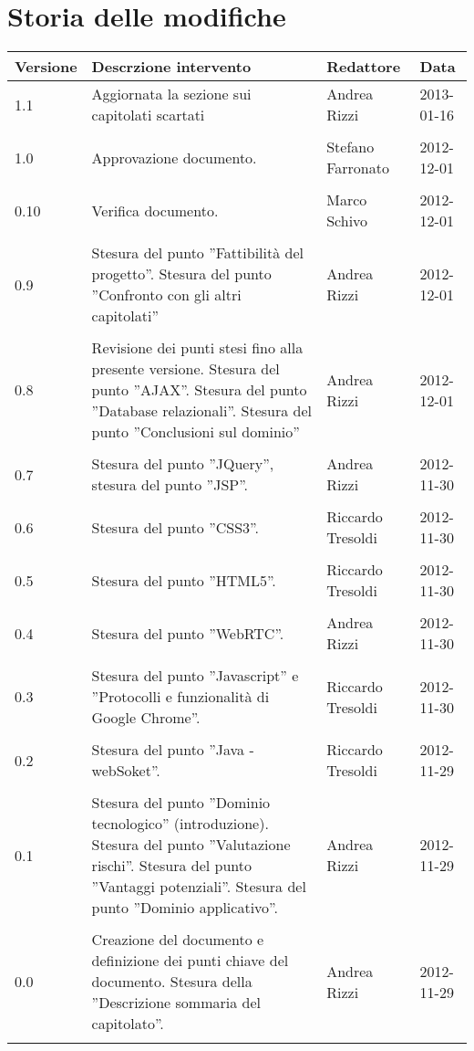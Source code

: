\section*{Storia delle modifiche}
\begin{tabularx}{\textwidth}{lXll}
\toprule
Versione & Descrzione intervento & Redattore & Data\\
\midrule %
1.1 & Aggiornata la sezione sui capitolati scartati & Andrea Rizzi & 2013-01-16\\\\
1.0 & Approvazione documento. & Stefano Farronato & 2012-12-01\\\\
0.10 & Verifica documento. & Marco Schivo & 2012-12-01\\\\
0.9 & Stesura del punto ''Fattibilità del progetto''. Stesura del punto ''Confronto con gli altri capitolati'' & Andrea Rizzi & 2012-12-01\\\\
0.8 & Revisione dei punti stesi fino alla presente versione. Stesura del punto ''AJAX''. Stesura del punto ''Database relazionali''. Stesura del punto ''Conclusioni sul dominio'' & Andrea Rizzi & 2012-12-01\\\\
0.7 & Stesura del punto ''JQuery'', stesura del punto ''JSP''. & Andrea Rizzi & 2012-11-30\\\\
0.6 & Stesura del punto ''CSS3''. & Riccardo Tresoldi & 2012-11-30\\\\
0.5 & Stesura del punto ''HTML5''. & Riccardo Tresoldi& 2012-11-30\\\\
0.4 & Stesura del punto ''WebRTC''. & Andrea Rizzi & 2012-11-30\\\\
0.3 & Stesura del punto ''Javascript'' e ''Protocolli e funzionalità di Google Chrome''.  & Riccardo Tresoldi & 2012-11-30\\\\
0.2 & Stesura del punto ''Java - webSoket''.  & Riccardo Tresoldi & 2012-11-29\\\\
0.1 & Stesura del punto ''Dominio tecnologico'' (introduzione). Stesura del punto ''Valutazione rischi''. Stesura del punto ''Vantaggi potenziali''. Stesura del punto ''Dominio applicativo''.  & Andrea Rizzi & 2012-11-29\\\\
0.0 & Creazione del documento e definizione dei punti chiave del documento. Stesura della ''Descrizione sommaria del capitolato''. & Andrea Rizzi & 2012-11-29\\\\
\bottomrule
\end{tabularx}
\newpage


